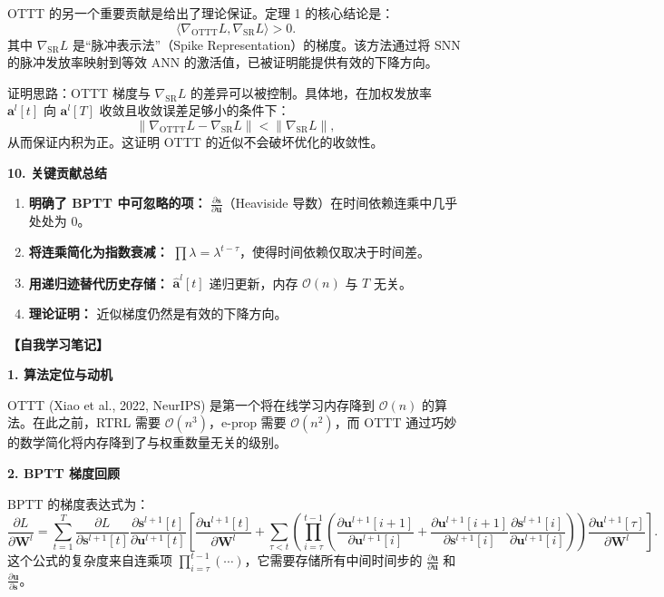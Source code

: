 \documentclass[journal,12pt,onecolumn]{IEEEtran}
\begin{document}
OTTT 的另一个重要贡献是给出了理论保证。定理 1 的核心结论是：
\begin{equation}
    \langle \nabla_{\text{OTTT}}L, \nabla_{\text{SR}}L \rangle > 0. \tag{11}
\end{equation}
其中 $\nabla_{\text{SR}}L$ 是“脉冲表示法”（Spike Representation）的梯度。该方法通过将 SNN 的脉冲发放率映射到等效 ANN 的激活值，已被证明能提供有效的下降方向。

证明思路：OTTT 梯度与 $\nabla_{\text{SR}}L$ 的差异可以被控制。具体地，在加权发放率 $\mathbf{a}^l[t]$ 向 $\mathbf{a}^l[T]$ 收敛且收敛误差足够小的条件下：
\[
\left\| \nabla_{\text{OTTT}}L - \nabla_{\text{SR}}L \right\| < \left\| \nabla_{\text{SR}}L \right\|,
\]
从而保证内积为正。这证明 OTTT 的近似不会破坏优化的收敛性。

\medskip\noindent\textbf{10. 关键贡献总结}

\begin{enumerate}
    \item \textbf{明确了 BPTT 中可忽略的项：} $\frac{\partial \mathbf{s}}{\partial \mathbf{u}}$（Heaviside 导数）在时间依赖连乘中几乎处处为 0。
    \item \textbf{将连乘简化为指数衰减：} $\prod \lambda = \lambda^{t-\tau}$，使得时间依赖仅取决于时间差。
    \item \textbf{用递归迹替代历史存储：} $\hat{\mathbf{a}}^l[t]$ 递归更新，内存 $\mathcal{O}(n)$ 与 $T$ 无关。
    \item \textbf{理论证明：} 近似梯度仍然是有效的下降方向。
\end{enumerate}

\bigskip\noindent\textbf{【自我学习笔记】}

\medskip\noindent\textbf{1. 算法定位与动机}

OTTT (Xiao et al., 2022, NeurIPS) 是第一个将在线学习内存降到 $\mathcal{O}(n)$ 的算法。在此之前，RTRL 需要 $\mathcal{O}(n^3)$，e-prop 需要 $\mathcal{O}(n^2)$，而 OTTT 通过巧妙的数学简化将内存降到了与权重数量无关的级别。

\medskip\noindent\textbf{2. BPTT 梯度回顾}

BPTT 的梯度表达式为：
\[
\frac{\partial L}{\partial \mathbf{W}^l} = \sum_{t=1}^T \frac{\partial L}{\partial \mathbf{s}^{l+1}[t]} \frac{\partial \mathbf{s}^{l+1}[t]}{\partial \mathbf{u}^{l+1}[t]} \left[ \frac{\partial \mathbf{u}^{l+1}[t]}{\partial \mathbf{W}^l} + \sum_{\tau < t} \left( \prod_{i=\tau}^{t-1} \left( \frac{\partial \mathbf{u}^{l+1}[i+1]}{\partial \mathbf{u}^{l+1}[i]} + \frac{\partial \mathbf{u}^{l+1}[i+1]}{\partial \mathbf{s}^{l+1}[i]} \frac{\partial \mathbf{s}^{l+1}[i]}{\partial \mathbf{u}^{l+1}[i]} \right) \right) \frac{\partial \mathbf{u}^{l+1}[\tau]}{\partial \mathbf{W}^l} \right]. \tag{3}
\]
这个公式的复杂度来自连乘项 $\prod_{i=\tau}^{t-1} (\cdots)$，它需要存储所有中间时间步的 $\frac{\partial \mathbf{u}}{\partial \mathbf{u}}$ 和 $\frac{\partial \mathbf{u}}{\partial \mathbf{s}}$。
\end{document}
